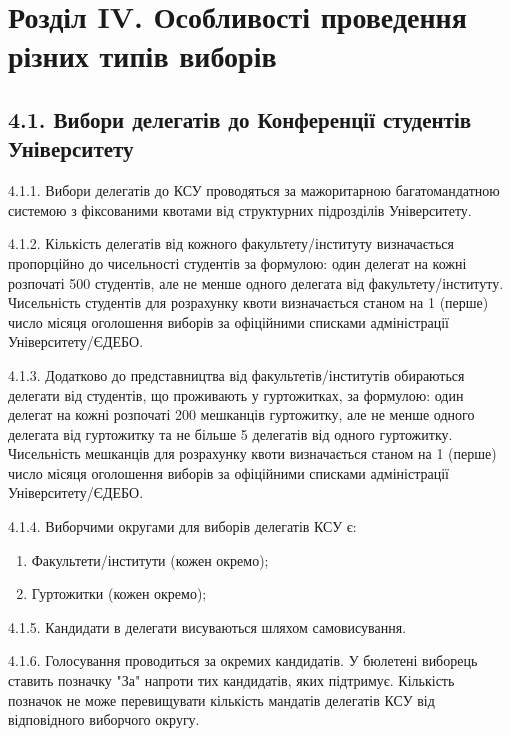 \section*{Розділ IV. Особливості проведення різних типів виборів}

\subsection*{4.1. Вибори делегатів до Конференції студентів Університету}
    4.1.1. Вибори делегатів до КСУ проводяться за мажоритарною багатомандатною системою з фіксованими квотами від структурних підрозділів Університету.

    4.1.2. Кількість делегатів від кожного факультету/інституту визначається пропорційно до чисельності студентів за формулою: один делегат на кожні розпочаті 500 студентів, але не менше одного делегата від факультету/інституту. Чисельність студентів для розрахунку квоти визначається станом на 1 (перше) число місяця оголошення виборів за офіційними списками адміністрації Університету/ЄДЕБО.

    4.1.3. Додатково до представництва від факультетів/інститутів обираються делегати від студентів, що проживають у гуртожитках, за формулою: один делегат на кожні розпочаті 200 мешканців гуртожитку, але не менше одного делегата від гуртожитку та не більше 5 делегатів від одного гуртожитку. Чисельність мешканців для розрахунку квоти визначається станом на 1 (перше) число місяця оголошення виборів за офіційними списками адміністрації Університету/ЄДЕБО.

    4.1.4. Виборчими округами для виборів делегатів КСУ є:
        \begin{enumerate}[label=\alph*)]
            \item Факультети/інститути (кожен окремо);
            \item Гуртожитки (кожен окремо);
        \end{enumerate}

    4.1.5. Кандидати в делегати висуваються шляхом самовисування.

    4.1.6. Голосування проводиться за окремих кандидатів. У бюлетені виборець ставить позначку "За" напроти тих кандидатів, яких підтримує. Кількість позначок не може перевищувати кількість мандатів делегатів КСУ від відповідного виборчого округу.

